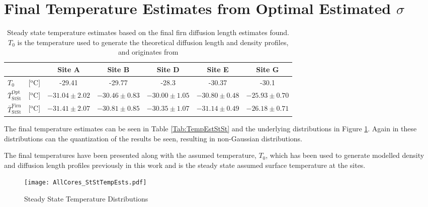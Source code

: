 \documentclass[../../CompleteThesis2/Complete_2ndDraft]{subfiles}
\begin{document}
\section[Temperature Estimates from Data]{Final Temperature Estimates from Optimal Estimated $\sigma$}
\label{Sec:Results_TempEstData}
\begin{table}[ht]
	\centering
	\begin{tabular}{l c|c|c|c|c|c}
		& & Site A & Site B & Site D & Site E & Site G \\
		\hline
		\hline
		$T_0$ & [$^{\text{o}}$C] & -29.41 & -29.77 & -28.3 & -30.37 & -30.1 \\[0.1cm]
		$\bar{T}_{\text{StSt}}^{\text{Opt}}$ & [$^{\text{o}}$C] & $-31.04 \pm 2.02$ & $-30.46 \pm 0.83$ & $-30.00 \pm 1.05$ & $-30.80 \pm 0.48$ & $-25.93 \pm 0.70$ \\[0.5cm]
		$\bar{T}_{\text{StSt}}^{\text{Firn}}$ & [$^{\text{o}}$C] & $-31.41 \pm 2.07$ & $-30.81 \pm 0.85$ & $-30.35 \pm 1.07$ & $-31.14 \pm 0.49$ & $-26.18 \pm 0.71$ \\[0.15cm]
	\end{tabular}
	\caption[Steady State Temperature Estimates]{\small Steady state temperature estimates based on the final firn diffusion length estimates found. $T_0$ is the temperature used to generate the theoretical diffusion length and density profiles, and originates from \cite[add. text]{keylist}}
\end{table}

The final temperature estimates can be seen in Table \ref{Tab:TempEstStSt} and the underlying distributions in Figure \ref{fig:AllCores_StStTempEsts}. Again in these distributions can the quantization of the results be seen, resulting in non-Gaussian distributions.

The final temperatures have been presented along with the assumed temperature, $T_0$, which has been used to generate modelled density and diffusion length profiles previously in this work and is the steady state assumed surface temperature at the sites.
\begin{figure}[h]
	\centering
	\texttt{[image: AllCores\_StStTempEsts.pdf]}
	\caption[Steady State Temperature Distributions]{\small Steady State Temperature Distributions}
	\label{fig:AllCores_StStTempEsts}
\end{figure}


\end{document}
